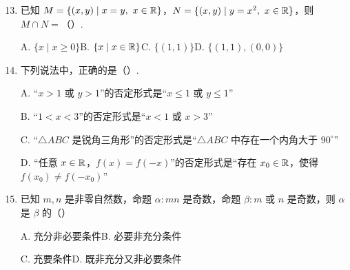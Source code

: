 \documentclass[a4paper,11pt]{article}
\begin{document}

\begin{enumerate}
\setcounter{enumi}{12}

\item 已知 $M=\{(x,y)\mid x=y,\ x\in\R\}$，$N=\{(x,y)\mid y=x^2,\ x\in\R\}$，则 $M\cap N=$\mbox{（\quad）.}

\keepwithprev
A. $\{x\mid x\geqslant 0\}$\qquad B. $\{x\mid x\in\mathbb{R}\}$\qquad C. $\{(1,1)\}$\qquad D. $\{(1,1),(0,0)\}$


\ifanswer
\solbegin
{}
\solend

\fi

\item 下列说法中，正确的是\mbox{（\quad）.}

\keepwithprev
A. “$x>1$ 或 $y>1$”的否定形式是“$x\leqslant 1$ 或 $y\leqslant 1$”

B. “$1<x<3$”的否定形式是“$x<1$ 或 $x>3$”

C. “$\triangle ABC$ 是锐角三角形”的否定形式是“$\triangle ABC$ 中存在一个内角大于 $90^\circ$”

D. “任意 $x\in\mathbb{R}$，$f(x)=f(-x)$”的否定形式是“存在 $x_0\in\mathbb{R}$，使得 $f(x_0)\neq f(-x_0)$”


\item 已知 $m,n$ 是非零自然数，命题 $\alpha:mn$ 是奇数，命题 $\beta:m$ 或 $n$ 是奇数，则 $\alpha$ 是 $\beta$ 的\mbox{（\quad）}

\keepwithprev
A. 充分非必要条件\qquad B. 必要非充分条件

C. 充要条件\qquad D. 既非充分又非必要条件


\ifanswer
\solbegin
{}
\solend


\end{enumerate}
\end{document}
